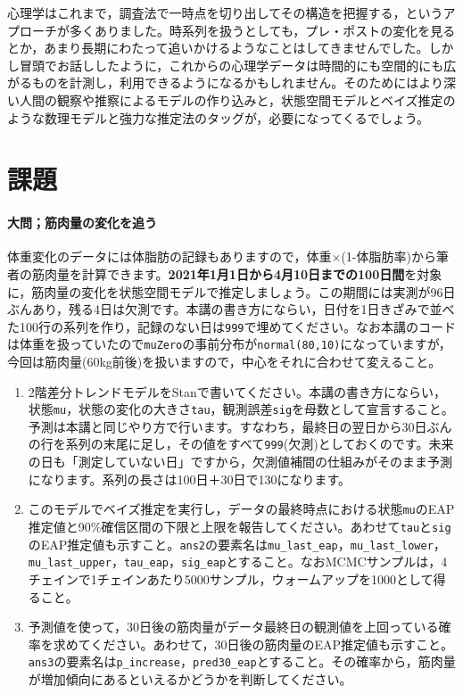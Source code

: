 \documentclass{ltjsbook}
\begin{document}
心理学はこれまで，調査法で一時点を切り出してその構造を把握する，というアプローチが多くありました。時系列を扱うとしても，プレ・ポストの変化を見るとか，あまり長期にわたって追いかけるようなことはしてきませんでした。しかし冒頭でお話ししたように，これからの心理学データは時間的にも空間的にも広がるものを計測し，利用できるようになるかもしれません。そのためにはより深い人間の観察や推察によるモデルの作り込みと，状態空間モデルとベイズ推定のような数理モデルと強力な推定法のタッグが，必要になってくるでしょう。

\section{課題}


\paragraph{大問；筋肉量の変化を追う}
体重変化のデータには体脂肪の記録もありますので，体重$\times$(1-体脂肪率)から筆者の筋肉量を計算できます。\textbf{2021年1月1日から4月10日までの100日間}を対象に，筋肉量の変化を状態空間モデルで推定しましょう。この期間には実測が96日ぶんあり，残る4日は欠測です。本講の書き方にならい，日付を1日きざみで並べた100行の系列を作り，記録のない日は\verb|999|で埋めてください。なお本講のコードは体重を扱っていたので\verb|muZero|の事前分布が\verb|normal(80,10)|になっていますが，今回は筋肉量(60kg前後)を扱いますので，中心をそれに合わせて変えること。
\begin{enumerate}
	\item 2階差分トレンドモデルをStanで書いてください。本講の書き方にならい，状態\verb|mu|，状態の変化の大きさ\verb|tau|，観測誤差\verb|sig|を母数として宣言すること。予測は本講と同じやり方で行います。すなわち，最終日の翌日から30日ぶんの行を系列の末尾に足し，その値をすべて\verb|999|(欠測)としておくのです。未来の日も「測定していない日」ですから，欠測値補間の仕組みがそのまま予測になります。系列の長さは100日＋30日で130になります。
	\item このモデルでベイズ推定を実行し，データの最終時点における状態\verb|mu|のEAP推定値と90\%確信区間の下限と上限を報告してください。あわせて\verb|tau|と\verb|sig|のEAP推定値も示すこと。\verb|ans2|の要素名は\verb|mu_last_eap|，\verb|mu_last_lower|，\verb|mu_last_upper|，\verb|tau_eap|，\verb|sig_eap|とすること。なおMCMCサンプルは，4チェインで1チェインあたり5000サンプル，ウォームアップを1000として得ること。
	\item 予測値を使って，30日後の筋肉量がデータ最終日の観測値を上回っている確率を求めてください。あわせて，30日後の筋肉量のEAP推定値も示すこと。\verb|ans3|の要素名は\verb|p_increase|，\verb|pred30_eap|とすること。その確率から，筋肉量が増加傾向にあるといえるかどうかを判断してください。
\end{enumerate}
\end{document}
